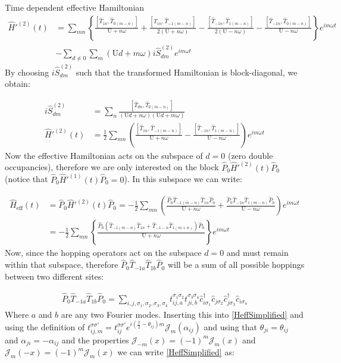 \begin{section}{Time dependent effective Hamiltonian}
\begin{align*}
\hat{H}'^{(2)}(t) &= \sum_{mn} \left\{ \frac{\left[\hat{T}_{1n}, \hat{T}_{0(m-n)} \right]}{\text{U}+n\omega} + \frac{\left[\hat{T}_{1n}, \hat{T}_{-1(m-n)} \right]}{2(\text{U}+n\omega)} - \frac{\left[\hat{T}_{-1n}, \hat{T}_{1(m-n)} \right]}{2(\text{U}-n\omega)} - \frac{\left[\hat{T}_{-1n}, \hat{T}_{0(m-n)} \right]}{\text{U}-n\omega} \right\} e^{im\omega t} \\
&-\sum_{d\neq 0}\sum_m (\text{U}d+m\omega) i\hat{S}^{(2)}_{dm} e^{im\omega t}
\end{align*}
By choosing $i\hat{S}^{(2)}_{dm}$ such that the transformed Hamiltonian is block-diagonal, we obtain:

\begin{align}
i\hat{S}^{(2)}_{dm} &= \sum_n \frac{\left[ \hat{T}_{dn}, \hat{T}_{0(m-n)} \right]}{(\text{U}d+n\omega)(\text{U}d+m\omega)} \label{2ndOSpin}\\
\hat{H}'^{(2)}(t) &= \frac{1}{2}\sum_{mn} \left( \frac{\left[\hat{T}_{1n}, \hat{T}_{-1(m-n)} \right]}{\text{U}+n\omega} - \frac{\left[\hat{T}_{-1n}, \hat{T}_{1(m-n)} \right]}{\text{U}-n\omega} \right) e^{im\omega t} \label{2ndOH}
\end{align}
Now the effective Hamiltonian acts on the subspace of $d=0$ (zero double occupancies), therefore we are only interested on the block $\hat{P}_0 \hat{H}'^{(2)}(t) \hat{P}_0$ (notice that $\hat{P}_0 \hat{H}'^{(1)}(t) \hat{P}_0 = 0$). In this subspace we can write:

\begin{align}
\hat{H}_{\text{eff}}(t) &= \hat{P}_0\hat{H}'^{(2)}(t)\hat{P}_0 = -\frac{1}{2}\sum_{mn} \left( \frac{\hat{P}_0  \hat{T}_{-1(m-n)}\hat{T}_{1n}\hat{P}_0}{\text{U}+n\omega} + \frac{\hat{P}_0 \hat{T}_{-1n} \hat{T}_{1(m-n)} \hat{P}_0}{\text{U}-n\omega} \right) e^{im\omega t} \nonumber \\
&= -\frac{1}{2}\sum_{mn} \left\{ \frac{\hat{P}_0  (\hat{T}_{-1(m-n)}\hat{T}_{1n} + \hat{T}_{-1-n}\hat{T}_{1(m+n)})\hat{P}_0}{\text{U}+n\omega} \right\} e^{im\omega t} \label{2ndOHeff}
\end{align}
Now, since the hopping operators act on the subspace $d=0$ and must remain within that subspace, therefore $\hat{P}_0 \hat{T}_{-1a} \hat{T}_{1b} \hat{P}_0$ will be a sum of all possible hoppings between two different sites:

\begin{align*}
\hat{P}_0 \hat{T}_{-1a} \hat{T}_{1b} \hat{P}_0 = \sum_{i,j, \sigma_1, \sigma_2, \sigma_3, \sigma_4} t_{ij,a}^{\sigma_1 \sigma_2} t_{ji,b}^{\sigma_3 \sigma_4} \hat{c}_{i \sigma_1}^\dagger \hat{c}_{j \sigma_2} \hat{c}_{j \sigma_3}^\dagger \hat{c}_{i \sigma_4}
\end{align*}
Where $a$ and $b$ are any two Fourier modes. Inserting this into \ref{HeffSimplified} and using the definition of $t_{ij,m}^{\sigma \sigma'} = t_{ij}^{\sigma \sigma'} e^{i(\frac{\pi}{2}-\theta_{ij})m} \mathcal{J}_m(\alpha_{ij})$ and using that $\theta_{ji} = \theta_{ij}$ and $\alpha_{ji} = -\alpha_{ij}$ and the properties $\mathcal{J}_{-m}(x) = (-1)^m\mathcal{J}_m(x)$ and $\mathcal{J}_m(-x) = (-1)^m\mathcal{J}_m(x)$ we can write \ref{HeffSimplified} as:


\end{section}
